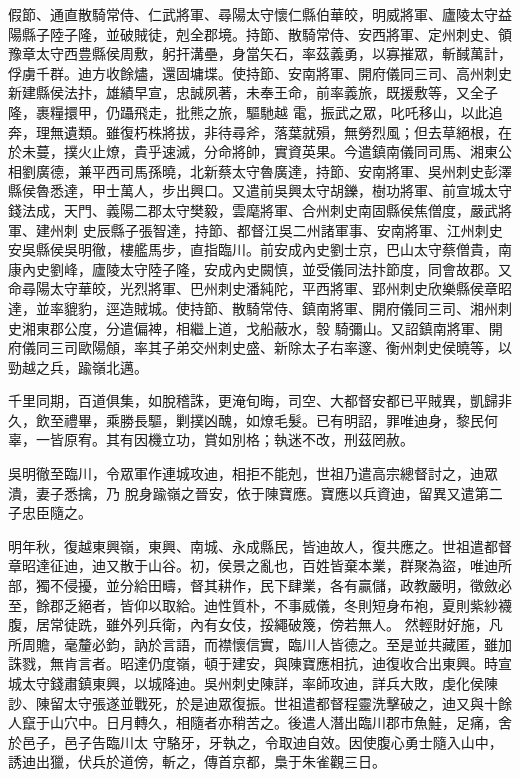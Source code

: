 \begin{pinyinscope}
 假節、通直散騎常侍、仁武將軍、尋陽太守懷仁縣伯華皎，明威將軍、廬陵太守益陽縣子陸子隆，並破賊徒，剋全郡境。持節、散騎常侍、安西將軍、定州刺史、領豫章太守西豊縣侯周敷，躬扞溝壘，身當矢石，率茲義勇，以寡摧眾，斬馘萬計，俘虜千群。迪方收餘燼，還固墉堞。使持節、安南將軍、開府儀同三司、高州刺史新建縣侯法抃，雄績早宣，忠誠夙著，未奉王命，前率義旅，既援敷等，又全子隆，裹糧擐甲，仍躡飛走，批熊之旅，驅馳越
 電，振武之眾，叱吒移山，以此追奔，理無遺類。雖復朽株將拔，非待尋斧，落葉就殞，無勞烈風；但去草絕根，在於未蔓，撲火止燎，貴乎速滅，分命將帥，實資英果。今遣鎮南儀同司馬、湘東公相劉廣德，兼平西司馬孫曉，北新蔡太守魯廣達，持節、安南將軍、吳州刺史彭澤縣侯魯悉達，甲士萬人，步出興口。又遣前吳興太守胡鑠，樹功將軍、前宣城太守錢法成，天門、義陽二郡太守樊毅，雲麾將軍、合州刺史南固縣侯焦僧度，嚴武將軍、建州刺
 史辰縣子張智達，持節、都督江吳二州諸軍事、安南將軍、江州刺史安吳縣侯吳明徹，樓艦馬步，直指臨川。前安成內史劉士京，巴山太守蔡僧貴，南康內史劉峰，廬陵太守陸子隆，安成內史闕慎，並受儀同法抃節度，同會故郡。又命尋陽太守華皎，光烈將軍、巴州刺史潘純陀，平西將軍、郢州刺史欣樂縣侯章昭達，並率貔豹，逕造賊城。使持節、散騎常侍、鎮南將軍、開府儀同三司、湘州刺史湘東郡公度，分遣偏裨，相繼上道，戈船蔽水，彀
 騎彌山。又詔鎮南將軍、開府儀同三司歐陽頠，率其子弟交州刺史盛、新除太子右率邃、衡州刺史侯曉等，以勁越之兵，踰嶺北邁。



 千里同期，百道俱集，如脫稽誅，更淹旬晦，司空、大都督安都已平賊異，凱歸非久，飲至禮畢，乘勝長驅，剿撲凶醜，如燎毛髮。已有明詔，罪唯迪身，黎民何辜，一皆原宥。其有因機立功，賞如別格；執迷不改，刑茲罔赦。



 吳明徹至臨川，令眾軍作連城攻迪，相拒不能剋，世祖乃遣高宗總督討之，迪眾潰，妻子悉擒，乃
 脫身踰嶺之晉安，依于陳寶應。寶應以兵資迪，留異又遣第二子忠臣隨之。



 明年秋，復越東興嶺，東興、南城、永成縣民，皆迪故人，復共應之。世祖遣都督章昭達征迪，迪又散于山谷。初，侯景之亂也，百姓皆棄本業，群聚為盜，唯迪所部，獨不侵擾，並分給田疇，督其耕作，民下肆業，各有贏儲，政教嚴明，徵斂必至，餘郡乏絕者，皆仰以取給。迪性質朴，不事威儀，冬則短身布袍，夏則紫紗襪腹，居常徒跣，雖外列兵衛，內有女伎，挼繩破篾，傍若無人。
 然輕財好施，凡所周贍，毫釐必鈞，訥於言語，而襟懷信實，臨川人皆德之。至是並共藏匿，雖加誅戮，無肯言者。昭達仍度嶺，頓于建安，與陳寶應相抗，迪復收合出東興。時宣城太守錢肅鎮東興，以城降迪。吳州刺史陳詳，率師攻迪，詳兵大敗，虔化侯陳訬、陳留太守張遂並戰死，於是迪眾復振。世祖遣都督程靈洗擊破之，迪又與十餘人竄于山穴中。日月轉久，相隨者亦稍苦之。後遣人潛出臨川郡市魚鮭，足痛，舍於邑子，邑子告臨川太
 守駱牙，牙執之，令取迪自效。因使腹心勇士隨入山中，誘迪出獵，伏兵於道傍，斬之，傳首京都，梟于朱雀觀三日。




\end{pinyinscope}
